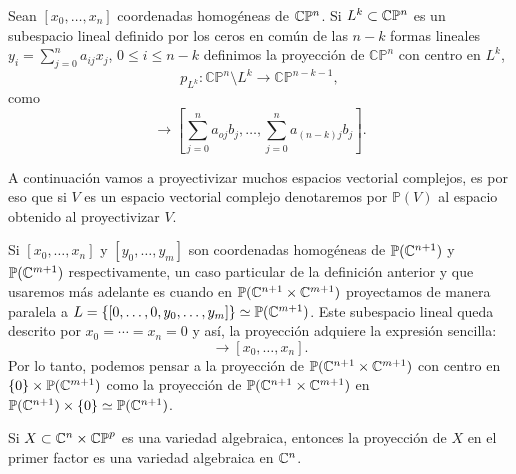 \begin{defn}
\label{Def:ProyeccionProyectiva}
Sean $[x_{0},\ldots,x_{n}]$ coordenadas homogéneas de $\mathbb{C}\mathbb{P}^{n}$. Si $L^{k}\subset\mathbb{C}\mathbb{P}^{n}$ es un subespacio lineal definido por los ceros en común de las $n-k$ formas lineales $y_{i}=\sum_{j=0}^{n} a_{ij}x_{j}$, $0\leq i\leq n-k$ definimos la proyección de $\mathbb{CP}^{n}$ con centro en $L^{k}$,
\begin{equation*}
p_{L^{k}}\colon \mathbb{CP}^{n}\setminus L^{k}\rightarrow\mathbb{CP}^{n-k-1},
\end{equation*}
como
\begin{equation*}
[b_{0},\ldots,b_{n}]\rightarrow[\sum_{j=0}^{n} a_{oj}b_{j},\ldots,\sum_{j=0}^{n} a_{(n-k)j}b_{j}].
\end{equation*}
\end{defn}

A continuación vamos a proyectivizar muchos espacios vectorial complejos, es por eso que si $V$ es un espacio vectorial complejo denotaremos por $\mathbb{P}(V)$ al espacio obtenido al proyectivizar $V$.

\begin{Ejemplo}
\label{Ej:ProyeccionCanonica}
Si $[x_{0},\ldots,x_{n}]$ y $[y_{0},\ldots,y_{m}]$ son coordenadas homogéneas de $\mathbb{P}(\mathbb{C}^{n+1})$ y $\mathbb{P}(\mathbb{C}^{m+1})$ respectivamente, un caso particular de la definición anterior y que usaremos más adelante es cuando en $\mathbb{P}(\mathbb{C}^{n+1}\times\mathbb{C}^{m+1})$ proyectamos de manera paralela a $L=\{ [0,\ldots,0,y_{0},\ldots,y_{m}] \}\simeq\mathbb{P}(\mathbb{C}^{m+1})$. Este subespacio lineal queda descrito por $x_{0}=\cdots=x_{n}=0$ y así, la proyección adquiere la expresión sencilla:
\begin{equation*}
[x_{0},\ldots,x_{n},y_{0},\ldots,y_{m}]\rightarrow [x_{0},\ldots,x_{n}].
\end{equation*}
Por lo tanto, podemos pensar a la proyección de $\mathbb{P}(\mathbb{C}^{n+1}\times\mathbb{C}^{m+1})$ con centro en $\{0\}\times\mathbb{P}(\mathbb{C}^{m+1})$ como la proyección de $\mathbb{P}(\mathbb{C}^{n+1}\times\mathbb{C}^{m+1})$ en $\mathbb{P}(\mathbb{C}^{n+1})\times\{0\}\simeq\mathbb{P}(\mathbb{C}^{n+1})$.  
\end{Ejemplo}

\begin{Teorema}
\label{Teo:CompacidadProyectiva}
Si $X\subset\mathbb{C}^{n}\times\mathbb{CP}^{p}$ es una variedad algebraica, entonces la proyección de $X$ en el primer factor es una variedad algebraica en $\mathbb{C}^{n}$.
\end{Teorema}

